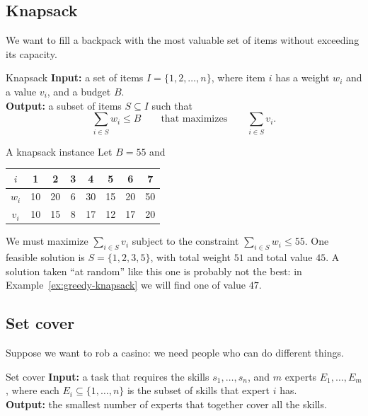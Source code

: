 \documentclass[a4paper,12pt,oneside]{report}
\begin{document}
\subsection{Knapsack}

We want to fill a backpack with the most valuable set of items without
exceeding its capacity.

\begin{framedproblem}{Knapsack}\label{prob:knapsack}
\textbf{Input:} a set of items $I=\{1,2,\ldots,n\}$, where item $i$
has a weight $w_i$ and a value $v_i$, and a budget $B$.\\
\textbf{Output:} a subset of items $S\subseteq I$ such that
\[
  \sum_{i\in S}w_i\leq B
  \qquad\text{that maximizes}\qquad
  \sum_{i\in S}v_i.
\]
\end{framedproblem}

\begin{framedexample}{A knapsack instance}\label{ex:knapsack}
Let $B=55$ and
\begin{center}
\begin{tabular}{c|ccccccc}
  $i$   & 1  & 2  & 3 & 4  & 5  & 6  & 7\\
  \hline
  $w_i$ & 10 & 20 & 6 & 30 & 15 & 20 & 50\\
  $v_i$ & 10 & 15 & 8 & 17 & 12 & 17 & 20
\end{tabular}
\end{center}
We must maximize $\sum_{i\in S}v_i$ subject to the constraint
$\sum_{i\in S}w_i\leq55$. One feasible solution is $S=\{1,2,3,5\}$,
with total weight $51$ and total value $45$. A solution taken ``at
random'' like this one is probably not the best: in
Example~\ref{ex:greedy-knapsack} we will find one of value $47$.
\end{framedexample}

\subsection{Set cover}

Suppose we want to rob a casino: we need people who can do different
things.

\begin{framedproblem}{Set cover}\label{prob:set-cover}
\textbf{Input:} a task that requires the skills $s_1,\ldots,s_n$, and
$m$ experts $E_1,\ldots,E_m$, where each $E_i\subseteq\{1,\ldots,n\}$
is the subset of skills that expert $i$ has.\\
\textbf{Output:} the smallest number of experts that together cover
all the skills.
\end{framedproblem}
\end{document}

